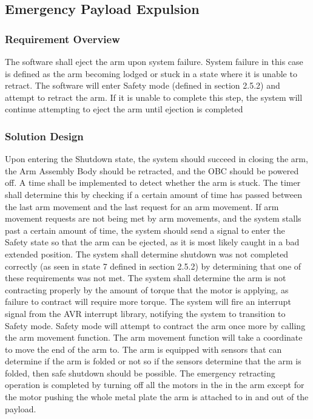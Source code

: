 \documentclass[letterpaper,10pt]{article}
\begin{document}
\subsection{Emergency Payload Expulsion}
\subsubsection{Requirement Overview}
The software shall eject the arm upon system failure. 
System failure in this case is defined as the arm becoming lodged or stuck in a state where it is unable to retract.
The software will enter Safety mode (defined in section 2.5.2) and attempt to retract the arm. If it is unable to complete this step,
 the system will continue attempting to eject the arm until ejection is completed
\subsubsection{Solution Design}
Upon entering the Shutdown state, the system should succeed in closing the arm, the Arm Assembly Body should be retracted, 
and the \gls{OBC} should be powered off. A time shall be implemented to detect whether the arm is stuck. The timer shall determine this by 
checking if a certain amount of time has passed between the last arm movement and the last request for an arm movement. 
If arm movement requests are not being met by arm movements, and the system stalls past a certain amount of time, the system should 
send a signal to enter the Safety state so that the arm can be ejected, as it is most likely caught in a bad extended position.
The system shall determine shutdown was not completed correctly (as seen in state 7 defined in section 2.5.2) by determining that one 
of these requirements was not met.
The system shall determine the arm is not contracting properly by the amount of torque that the motor is applying, as failure to 
contract will require more torque. The system will fire an interrupt signal from the AVR interrupt library, notifying the system to 
transition to Safety mode. 
Safety mode will attempt to contract the arm once more by calling the arm movement function. The arm movement function will take a 
coordinate to move the end of the arm to. The arm is equipped with sensors that can determine if the arm is folded or not
so if the sensors determine that the arm is folded, then safe shutdown should be possible.
The emergency retracting operation is completed by turning off all the motors in the 
in the arm except for the motor pushing the whole metal plate the arm is attached to in and out of the payload.
\end{document}
